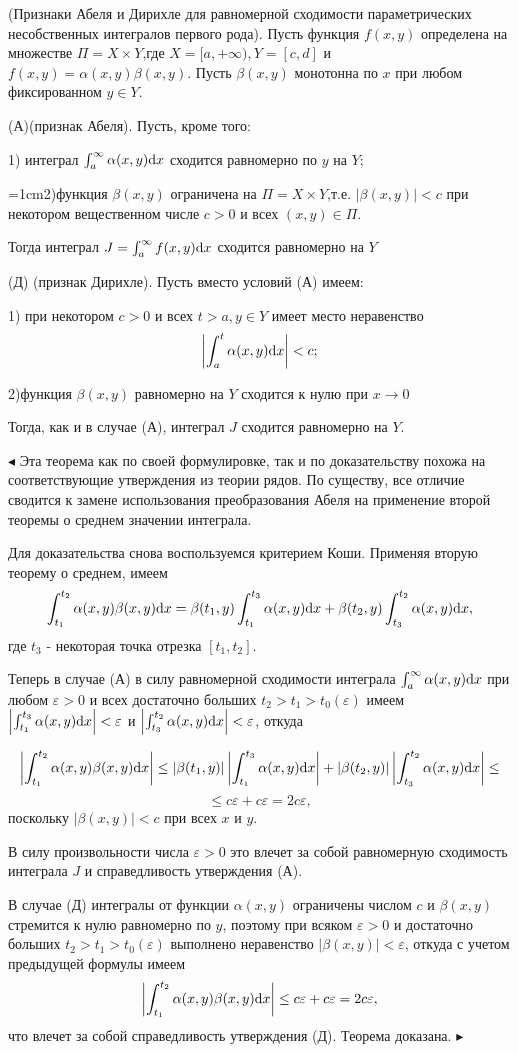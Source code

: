 \begin{theorem}
(Признаки Абеля и Дирихле для равномерной сходимости параметрических несобственных интегралов первого рода).
Пусть функция $f(x,y)$ определена на множестве $\Pi =X\times Y$,где $X=[a,+\infty), Y=[c,d]$ и $f(x,y)=\alpha(x,y)\beta(x,y)$. Пусть $\beta (x,y)$ монотонна по $x$ при любом фиксированном $y\in Y$.

(А)(признак Абеля). Пусть, кроме того:

1) интеграл $\int_a^\infty {\alpha (x,y){\rm d}x}$ сходится равномерно по $y$ на $Y$;

\parindent=1cm2)функция $\beta (x,y)$ ограничена на $\Pi =X\times Y$,т.е. $|\beta (x,y)|<c$ при некотором вещественном числе $c>0$ и всех $(x,y)\in \Pi$.

Тогда интеграл $J=\int_a^{\infty}{f(x,y){\rm d}x}$ сходится равномерно на $Y$ 

(Д) (признак Дирихле). Пусть вместо условий (А) имеем:

1) при некотором $c>0$ и всех $t>a, y\in Y$ имеет место неравенство
$$\left|\int_a^t {\alpha (x,y){\rm d}x}\right|<c;$$

2)функция $\beta(x,y)$ равномерно на $Y$ сходится к нулю при $x\to 0$ 

Тогда, как и в случае (А), интеграл $J$ сходится равномерно на $Y$.
\end{theorem}
$\blacktriangleleft$
Эта теорема как по своей формулировке, так и по доказательству похожа на соответствующие утверждения из теории рядов. По существу, все отличие сводится к замене использования преобразования Абеля на применение второй теоремы о среднем значении интеграла.

Для доказательства снова воспользуемся критерием Коши. Применяя вторую теорему о среднем, имеем
$$\int_{t_1}^{t_2}{\alpha(x,y)\beta(x,y){\rm d}x}=\beta(t_1,y)\int_{t_1}^{t_3}{\alpha(x,y){\rm d}x}+\beta(t_2,y)\int_{t_3}^{t_2}{\alpha(x,y){\rm d}x}, $$ 
где $t_3$ - некоторая точка отрезка $[t_1,t_2]$.

Теперь в случае (А) в силу равномерной сходимости интеграла $\int_a^\infty {\alpha(x,y){\rm d}x}$ при любом $\varepsilon>0$ и всех достаточно больших $t_2>t_1>t_0(\varepsilon)$ имеем $\left|\int_{t_1}^{t_3}{\alpha(x,y){\rm d}x}\right|<\varepsilon$ и $\left|\int_{t_3}^{t_2}{\alpha(x,y){\rm d}x}\right|<\varepsilon$, откуда

$$\left|\int_{t_1}^{t_2}{\alpha(x,y)\beta(x,y){\rm d}x}\right|\le |\beta(t_1,y)|\left|\int_{t_1}^{t_3}{\alpha(x,y){\rm d}x}\right|+|\beta(t_2,y)|\left|\int_{t_3}^{t_2}{\alpha(x,y){\rm d}x}\right|\le$$ $$\le c\varepsilon+c\varepsilon=2c\varepsilon,$$
поскольку $|\beta(x,y)|<c$ при всех $x$ и $y$.

В силу произвольности числа $\varepsilon>0$ это влечет за собой равномерную сходимость интеграла $J$ и справедливость утверждения (А).

В случае (Д) интегралы от функции $\alpha(x,y)$ ограничены числом $c$ и $\beta(x,y)$ стремится к нулю равномерно по $y$,  поэтому при всяком $\varepsilon>0$ и достаточно больших $t_2>t_1>t_0(\varepsilon)$ выполнено неравенство $|\beta(x,y)|<\varepsilon$, откуда с учетом предыдущей формулы имеем
$$\left|\int_{t_1}^{t_2}{\alpha(x,y)\beta(x,y){\rm d}x}\right|\le c\varepsilon+c\varepsilon=2c\varepsilon,$$
что влечет за собой справедливость утверждения (Д). Теорема доказана.
$\blacktriangleright$

